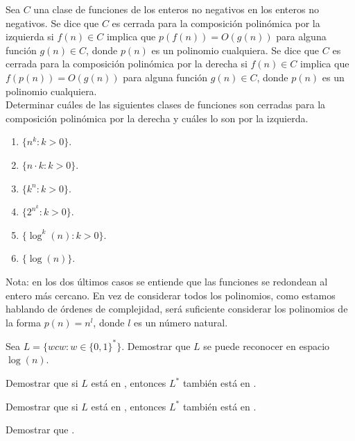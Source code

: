 \begin{ejercicio}
    Sea $C$ una clase de funciones de los enteros no negativos en los enteros no negativos. Se dice que $C$ es cerrada para la composición polinómica por la izquierda si $f(n) \in C$ implica que $p(f(n)) = O(g(n))$ para alguna función $g(n) \in C$, donde $p(n)$ es un polinomio cualquiera.
    Se dice que $C$ es cerrada para la composición polinómica por la derecha si $f(n) \in C$ implica que $f(p(n)) = O(g(n))$ para alguna función $g(n) \in C$, donde $p(n)$ es un polinomio cualquiera. \\

    \noindent Determinar cuáles de las siguientes clases de funciones son cerradas para la composición polinómica por la derecha y cuáles lo son por la izquierda.

    \begin{enumerate}
        \item[(a)] $\{n^k : k > 0\}$.
        \item[(b)] $\{n \cdot k : k > 0\}$.
        \item[(c)] $\{k^n : k > 0\}$.
        \item[(d)] $\{2^{n^k} : k > 0\}$.
        \item[(e)] $\{\log^k(n) : k > 0\}$.
        \item[(f)] $\{\log(n)\}$.
    \end{enumerate}

    Nota: en los dos últimos casos se entiende que las funciones se redondean al entero más cercano. En vez de considerar todos los polinomios, como estamos hablando de órdenes de complejidad, será suficiente considerar los polinomios de la forma $p(n) = n^l$, donde $l$ es un número natural.
\end{ejercicio}

\begin{ejercicio}
    Sea $L = \{wcw : w \in \{0,1\}^*\}.$ Demostrar que $L$ se puede reconocer en espacio $\log(n)$.
\end{ejercicio}

\begin{ejercicio}
    Demostrar que si $L$ está en \Pol, entonces $L^*$ también está en \Pol.
\end{ejercicio}

\begin{ejercicio}
    Demostrar que si $L$ está en \NP, entonces $L^*$ también está en \NP.
\end{ejercicio}

\begin{ejercicio}
    Demostrar que \NP {}.
\end{ejercicio}

